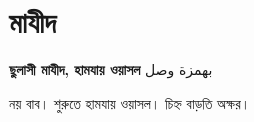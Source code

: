 \newpage

\section{মাযীদ}

\begin{center}
  {\bfseries ছুলাসী মাযীদ, হামযায় ওয়াসল}
  \enspace
  {\arabicfont \textarabic{بهمزة وصل}}
\end{center}

\vspace{0.1cm}

\noindent নয় বাব। শুরুতে হামযায় ওয়াসল। চিহ্ন বাড়তি অক্ষর।

\vspace{0.15cm}

\begingroup
\setlength{\arrayrulewidth}{0.5pt}
\setlength{\tabcolsep}{3pt}
\renewcommand{\arraystretch}{1.42}
\small

